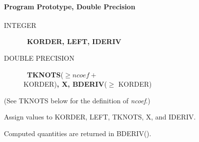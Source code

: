 \documentclass[twoside]{MATH77}
\begin{document}
\paragraph{Program Prototype, Double Precision}
\begin{description}
\item[INTEGER]  \ {\bf KORDER, LEFT, IDERIV}

\item[DOUBLE PRECISION]  \ {\bf TKNOTS}($\geq ncoef+$\\ KORDER){\bf , X,
BDERIV}($\geq $ KORDER)
\end{description}
(See TKNOTS below for the definition of {\em ncoef}.)

Assign values to KORDER, LEFT, TKNOTS, X, and IDERIV.
\begin{center}\vspace{-10pt}
\end{center}
Computed quantities are returned in BDERIV().
\end{document}
